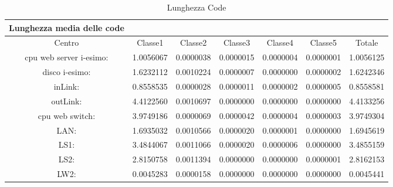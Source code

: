 \begin{table}[htbp]
\begin{center}
\begin{tabular}{||c|c|c|c|c|c|c||}
\hline
Lunghezza media delle code\\
\hline
Centro &Classe1 &Classe2 &Classe3 &Classe4 &Classe5 &Totale\\
\hline
\hline
 cpu web server i-esimo: 	&1.0056067	&0.0000038	&0.0000015	&0.0000004	&0.0000001	&1.0056125\\
\hline
 disco i-esimo: 	&1.6232112	&0.0010224	&0.0000007	&0.0000000	&0.0000002	&1.6242346\\
\hline
 inLink: 	&0.8558535	&0.0000028	&0.0000011	&0.0000002	&0.0000005	&0.8558581\\
\hline
 outLink: 	&4.4122560	&0.0010697	&0.0000000	&0.0000000	&0.0000000	&4.4133256\\
\hline
 cpu web switch: 	&3.9749186	&0.0000069	&0.0000042	&0.0000004	&0.0000003	&3.9749304\\
\hline
 LAN: 	&1.6935032	&0.0010566	&0.0000020	&0.0000001	&0.0000000	&1.6945619\\
\hline
 LS1: 	&3.4844067	&0.0011066	&0.0000020	&0.0000006	&0.0000000	&3.4855159\\
\hline
 LS2: 	&2.8150758	&0.0011394	&0.0000000	&0.0000000	&0.0000001	&2.8162153\\
\hline
 LW2: 	&0.0045283	&0.0000158	&0.0000000	&0.0000000	&0.0000000	&0.0045441\\
\hline
\end{tabular}
\end{center}
\caption{Lunghezza Code}
\label{lunghezzacode}
\end{table}

